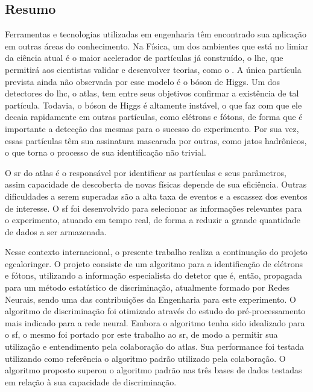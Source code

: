 \vfill
\begin{center}
\section*{Resumo\label{Resumo}}
\end{center}

Ferramentas e tecnologias utilizadas em engenharia têm encontrado sua
aplicação em outras áreas do conhecimento.
Na Física, um dos ambientes que está no limiar da ciência atual é o maior acelerador 
de partículas já construído, o \acrshort{lhc}, que permitirá aos
cientistas validar e desenvolver teorias, como o . A
única partícula prevista ainda não observada por esse modelo é o bóson
de Higgs. Um dos detectores do \acrshort{lhc}, o \acrshort{atlas}, tem entre seus objetivos 
confirmar a existência de tal partícula. Todavia, o bóson de Higgs é altamente
instável, o que faz com que ele decaia rapidamente em outras partículas, como elétrons e fótons, de forma que é importante 
a detecção das mesmas para o sucesso do experimento. Por sua vez, essas
partículas têm sua assinatura mascarada por outras, como jatos hadrônicos, o que
torna o processo de sua identificação não trivial. 

O \gls{sr} do \acrshort{atlas} é o responsável por identificar as
partículas e seus parâmetros, assim capacidade de descoberta de novas físicas 
depende de sua eficiência. Outras dificuldades a serem superadas são a alta taxa de
eventos e a escassez dos eventos de interesse. 
O \gls{sf} foi desenvolvido para selecionar as informações relevantes para o experimento, 
atuando em tempo real, de forma a reduzir a grande quantidade de dados a ser armazenada.

Nesse contexto internacional, o presente trabalho realiza a continuação
do projeto \acrshort{egcaloringer}. O projeto consiste de um algoritmo 
para a identificação de elétrons e fótons, utilizando a informação especialista 
do detetor que é, então, propagada para um método estatístico de discriminação, 
atualmente formado por Redes Neurais, sendo uma das contribuições da
Engenharia para este experimento. O algoritmo de discriminação foi otimizado 
através do estudo do pré-processamento mais indicado para a rede neural. 
Embora o algoritmo tenha sido idealizado para o \gls{sf}, 
o mesmo foi portado por este trabalho ao \gls{sr}, de modo a permitir sua utilização e 
entendimento pela colaboração do \acrshort{atlas}. Sua performance foi 
testada utilizando como referência o algoritmo padrão utilizado 
pela colaboração. O algoritmo proposto superou o algoritmo padrão nas três bases
de dados testadas em relação à sua capacidade de discriminação.

